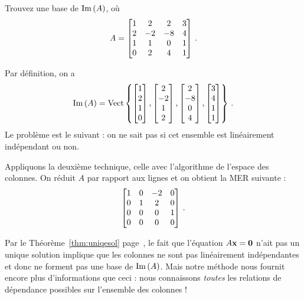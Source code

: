 \begin{myprob} Trouvez une base de $\operatorname{Im}\,(A)$, o\`u 
$$A = \left[ \begin{matrix} 
1&2&2&3\\2&-2&-8&4\\1&1&0&1\\0&2&4&1 \end{matrix} \right]\,.
$$
 
\begin{mysol} Par d\'efinition, on a 
$$
\operatorname{Im}\,(A) = \textrm{Vect}\left\{ \left[ \begin{matrix} 1\\2\\1\\0 \end{matrix} \right], \left[ \begin{matrix} 2\\-2\\1\\2 \end{matrix} \right], \left[ \begin{matrix} 2\\-8\\0\\4 \end{matrix} \right],
\left[ \begin{matrix} 3\\4\\1\\1 \end{matrix} \right] \right\}\,.
$$
Le problème est le suivant : on ne sait pas si cet ensemble est linéairement indépendant ou non.

Appliquons la deuxième technique, celle avec l'algorithme de l'espace des colonnes. On réduit $A$ par rapport aux lignes et on obtient la MER suivante :
$$
\left[ \begin{matrix} 1 & 0 & -2 & 0\\ 0 & 1 & 2 & 0\\ 0 & 0 & 0 & 1\\ 0 & 0 & 0 & 0 \end{matrix} \right]\,.
$$

Par le Théorème~\ref{thm:uniqesol} page~\pageref{section:uniqesol}, le fait que l'équation $A\mathbf{x}=\mathbf{0}$ n'ait pas un unique solution 
implique que les colonnes ne sont pas linéairement indépendantes et donc ne forment pas une
base de $\operatorname{Im}\,(A)$.  Mais notre méthode nous fournit encore plus d'informations que ceci : nous connaissons {\it toutes}
les relations de dépendance possibles sur l'ensemble des colonnes !


\end{mysol}
\end{myprob}
